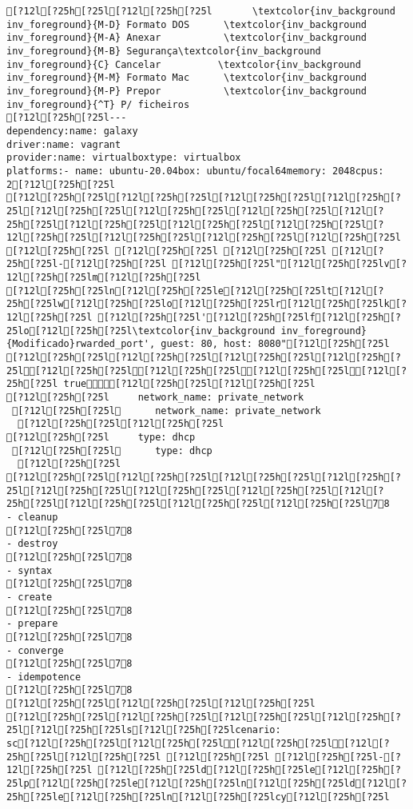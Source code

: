 \documentclass{scrartcl}
\begin{document}
\begin{Verbatim}
[?12l[?25h[?25l[?12l[?25h[?25l       \textcolor{inv_background inv_foreground}{M-D} Formato DOS      \textcolor{inv_background inv_foreground}{M-A} Anexar           \textcolor{inv_background inv_foreground}{M-B} Segurança\textcolor{inv_background inv_foreground}{C} Cancelar          \textcolor{inv_background inv_foreground}{M-M} Formato Mac      \textcolor{inv_background inv_foreground}{M-P} Prepor           \textcolor{inv_background inv_foreground}{^T} P/ ficheiros
[?12l[?25h[?25l---
dependency:name: galaxy
driver:name: vagrant
provider:name: virtualboxtype: virtualbox
platforms:- name: ubuntu-20.04box: ubuntu/focal64memory: 2048cpus: 2[?12l[?25h[?25l
[?12l[?25h[?25l[?12l[?25h[?25l[?12l[?25h[?25l[?12l[?25h[?25l[?12l[?25h[?25l[?12l[?25h[?25l[?12l[?25h[?25l[?12l[?25h[?25l[?12l[?25h[?25l[?12l[?25h[?25l[?12l[?25h[?25l[?12l[?25h[?25l[?12l[?25h[?25l[?12l[?25h[?25l[?12l[?25h[?25l [?12l[?25h[?25l [?12l[?25h[?25l [?12l[?25h[?25l [?12l[?25h[?25l-[?12l[?25h[?25l [?12l[?25h[?25l"[?12l[?25h[?25lv[?12l[?25h[?25lm[?12l[?25h[?25l
[?12l[?25h[?25ln[?12l[?25h[?25le[?12l[?25h[?25lt[?12l[?25h[?25lw[?12l[?25h[?25lo[?12l[?25h[?25lr[?12l[?25h[?25lk[?12l[?25h[?25l [?12l[?25h[?25l'[?12l[?25h[?25lf[?12l[?25h[?25lo[?12l[?25h[?25l\textcolor{inv_background inv_foreground}{Modificado}rwarded_port', guest: 80, host: 8080"[?12l[?25h[?25l
[?12l[?25h[?25l[?12l[?25h[?25l[?12l[?25h[?25l[?12l[?25h[?25l[?12l[?25h[?25l[?12l[?25h[?25l[?12l[?25h[?25l[?12l[?25h[?25l true[?12l[?25h[?25l[?12l[?25h[?25l
[?12l[?25h[?25l     network_name: private_network
 [?12l[?25h[?25l      network_name: private_network
  [?12l[?25h[?25l[?12l[?25h[?25l
[?12l[?25h[?25l     type: dhcp
 [?12l[?25h[?25l      type: dhcp
  [?12l[?25h[?25l
[?12l[?25h[?25l[?12l[?25h[?25l[?12l[?25h[?25l[?12l[?25h[?25l[?12l[?25h[?25l[?12l[?25h[?25l[?12l[?25h[?25l[?12l[?25h[?25l[?12l[?25h[?25l[?12l[?25h[?25l[?12l[?25h[?25l78
- cleanup
[?12l[?25h[?25l78
- destroy
[?12l[?25h[?25l78
- syntax
[?12l[?25h[?25l78
- create
[?12l[?25h[?25l78
- prepare
[?12l[?25h[?25l78
- converge
[?12l[?25h[?25l78
- idempotence
[?12l[?25h[?25l78
[?12l[?25h[?25l[?12l[?25h[?25l[?12l[?25h[?25l
[?12l[?25h[?25l[?12l[?25h[?25l[?12l[?25h[?25l[?12l[?25h[?25l[?12l[?25h[?25ls[?12l[?25h[?25lcenario:
sc[?12l[?25h[?25l[?12l[?25h[?25l[?12l[?25h[?25l[?12l[?25h[?25l[?12l[?25h[?25l [?12l[?25h[?25l [?12l[?25h[?25l-[?12l[?25h[?25l [?12l[?25h[?25ld[?12l[?25h[?25le[?12l[?25h[?25lp[?12l[?25h[?25le[?12l[?25h[?25ln[?12l[?25h[?25ld[?12l[?25h[?25le[?12l[?25h[?25ln[?12l[?25h[?25lcy[?12l[?25h[?25l

\end{Verbatim}
\end{document}
